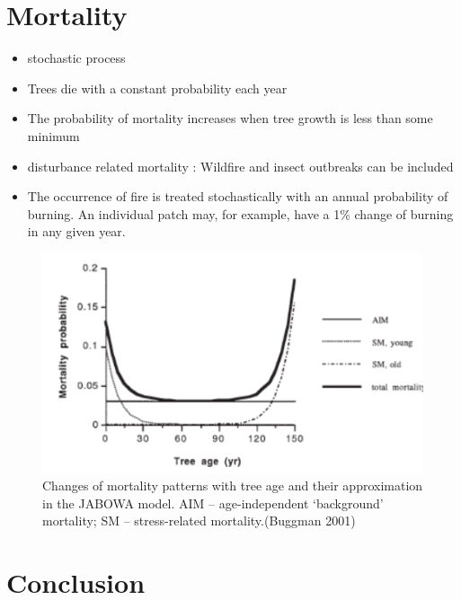 \documentclass[
  12pt,
  oneside]{book}
\begin{document}
\hypertarget{mortality}{%
\section{Mortality}\label{mortality}}

\begin{itemize}
\item
  stochastic process
\item
  Trees die with a constant probability each year
\item
  The probability of mortality increases when tree growth is less than some minimum
\item
  disturbance related mortality : Wildfire and insect outbreaks can be included
\item
  The occurrence of fire is treated stochastically with an annual probability of burning. An individual patch may, for example, have a 1\% change of burning in any given year.
\end{itemize}

\begin{figure}

{\centering \includegraphics[width=0.8\linewidth]{figures/chap6/f632_mortality_jabowa} 

}

\caption{Changes of mortality patterns with tree age and their approximation in the JABOWA model. AIM – age-independent ‘background’ mortality; SM – stress-related mortality.(Buggman 2001)}\label{fig:f632}
\end{figure}

\hypertarget{conclusion}{%
\section{Conclusion}\label{conclusion}}
\end{document}
